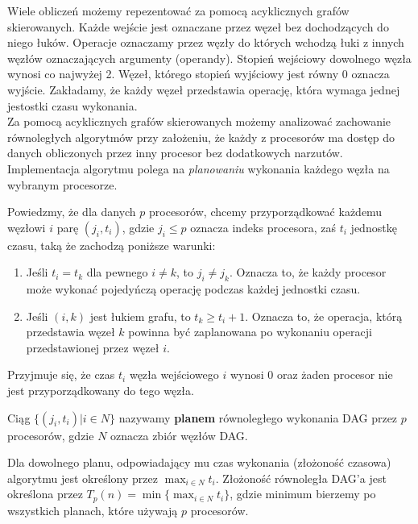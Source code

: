 Wiele obliczeń możemy repezentować za pomocą acyklicznych grafów skierowanych. Każde wejście jest oznaczane przez węzeł bez dochodzących do niego łuków. Operacje oznaczamy przez węzły do których wchodzą łuki z innych węzłów oznaczających argumenty (operandy). Stopień wejściowy dowolnego węzła wynosi co najwyżej 2. Węzeł, którego stopień wyjściowy jest równy 0 oznacza wyjście. Zakładamy, że każdy węzeł przedstawia operację, która wymaga jednej jestostki czasu wykonania.\\



Za pomocą acyklicznych grafów skierowanych możemy analizować zachowanie równoległych algorytmów przy założeniu, że każdy z procesorów ma dostęp do danych obliczonych przez inny procesor bez dodatkowych narzutów. Implementacja algorytmu polega na \emph{planowaniu} wykonania każdego węzła na wybranym procesorze.

Powiedzmy, że dla danych \(p\) procesorów, chcemy przyporządkować każdemu węzłowi \(i\) parę \((j_i, t_i)\), gdzie \(j_i \leq p\) oznacza indeks procesora, zaś \(t_i\) jednostkę czasu, taką że zachodzą poniższe warunki:
\begin{enumerate}
\item Jeśli \(t_i=t_k\) dla pewnego \(i\neq k\), to \(j_i\neq j_k\). Oznacza to, że każdy procesor może wykonać pojedyńczą operację podczas każdej jednostki czasu.
\item Jeśli \((i, k)\) jest łukiem grafu, to \(t_k\geq t_i + 1\). Oznacza to, że operacja, którą przedstawia węzeł \(k\) powinna być zaplanowana po wykonaniu operacji przedstawionej przez węzeł \(i\).
\end{enumerate}

Przyjmuje się, że czas \(t_i\) węzła wejściowego \(i\) wynosi 0 oraz żaden procesor nie jest przyporządkowany do tego węzła.\\
\begin{definicja}[Plan]\label{def:plan}
Ciąg \(\{(j_i, t_i) | i\in N\}\) nazywamy \textbf{planem} równoległego wykonania DAG przez \(p\) procesorów, gdzie \(N\) oznacza zbiór węzłów DAG.
\end{definicja}


Dla dowolnego planu, odpowiadający mu czas wykonania (złożoność czasowa) algorytmu jest określony przez \(\max_{i\in N}t_i\). Złożoność równoległa DAG'a jest określona przez \(T_{p}(n) = \min{\{\max_{i\in N}t_i\}}\), gdzie minimum bierzemy po wszystkich planach, które używają \(p\) procesorów.


